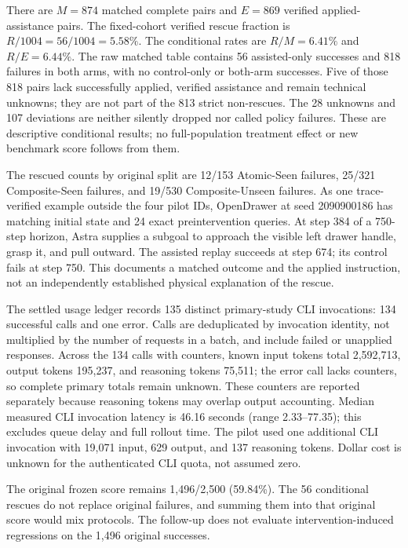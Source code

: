 \documentclass[10pt,twocolumn,letterpaper]{article}
\begin{document}
There are $M=874$ matched complete pairs and $E=869$ verified applied-assistance pairs. The fixed-cohort verified rescue fraction is $R/1004=56/1004=5.58\%$. The conditional rates are $R/M=6.41\%$ and $R/E=6.44\%$. The raw matched table contains 56 assisted-only successes and 818 failures in both arms, with no control-only or both-arm successes. Five of those 818 pairs lack successfully applied, verified assistance and remain technical unknowns; they are not part of the 813 strict non-rescues. The 28 unknowns and 107 deviations are neither silently dropped nor called policy failures. These are descriptive conditional results; no full-population treatment effect or new benchmark score follows from them.


The rescued counts by original split are 12/153 Atomic-Seen failures, 25/321 Composite-Seen failures, and 19/530 Composite-Unseen failures. As one trace-verified example outside the four pilot IDs, OpenDrawer at seed 2090900186 has matching initial state and 24 exact preintervention queries. At step 384 of a 750-step horizon, Astra supplies a subgoal to approach the visible left drawer handle, grasp it, and pull outward. The assisted replay succeeds at step 674; its control fails at step 750. This documents a matched outcome and the applied instruction, not an independently established physical explanation of the rescue.


The settled usage ledger records 135 distinct primary-study CLI invocations: 134 successful calls and one error. Calls are deduplicated by invocation identity, not multiplied by the number of requests in a batch, and include failed or unapplied responses. Across the 134 calls with counters, known input tokens total 2,592,713, output tokens 195,237, and reasoning tokens 75,511; the error call lacks counters, so complete primary totals remain unknown. These counters are reported separately because reasoning tokens may overlap output accounting. Median measured CLI invocation latency is 46.16 seconds (range 2.33--77.35); this excludes queue delay and full rollout time. The pilot used one additional CLI invocation with 19,071 input, 629 output, and 137 reasoning tokens. Dollar cost is unknown for the authenticated CLI quota, not assumed zero.


The original frozen score remains 1,496/2,500 (59.84\%). The 56 conditional rescues do not replace original failures, and summing them into that original score would mix protocols. The follow-up does not evaluate intervention-induced regressions on the 1,496 original successes.
\end{document}
